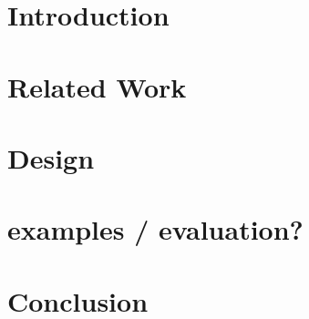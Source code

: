 \documentclass[conference]{IEEEtran}
\begin{document}
\begin{IEEEkeywords}

\end{IEEEkeywords}

\section{Introduction}



\section{Related Work}



\section{Design}



\section{examples / evaluation?}



\section{Conclusion}





\end{document}
